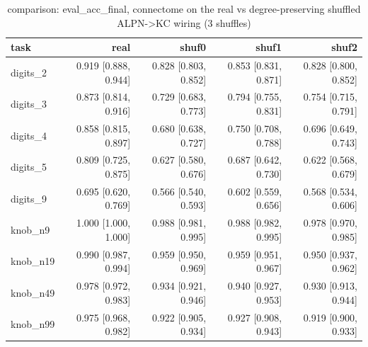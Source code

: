 \begin{table}[t]
\centering
\small
\begin{tabular}{lrrrr}
\toprule
task & real & shuf0 & shuf1 & shuf2 \\
\midrule
digits\_2 & 0.919 [0.888, 0.944] & 0.828 [0.803, 0.852] & 0.853 [0.831, 0.871] & 0.828 [0.800, 0.852] \\
digits\_3 & 0.873 [0.814, 0.916] & 0.729 [0.683, 0.773] & 0.794 [0.755, 0.831] & 0.754 [0.715, 0.791] \\
digits\_4 & 0.858 [0.815, 0.897] & 0.680 [0.638, 0.727] & 0.750 [0.708, 0.788] & 0.696 [0.649, 0.743] \\
digits\_5 & 0.809 [0.725, 0.875] & 0.627 [0.580, 0.676] & 0.687 [0.642, 0.730] & 0.622 [0.568, 0.679] \\
digits\_9 & 0.695 [0.620, 0.769] & 0.566 [0.540, 0.593] & 0.602 [0.559, 0.656] & 0.568 [0.534, 0.606] \\
knob\_n9 & 1.000 [1.000, 1.000] & 0.988 [0.981, 0.995] & 0.988 [0.982, 0.995] & 0.978 [0.970, 0.985] \\
knob\_n19 & 0.990 [0.987, 0.994] & 0.959 [0.950, 0.969] & 0.959 [0.951, 0.967] & 0.950 [0.937, 0.962] \\
knob\_n49 & 0.978 [0.972, 0.983] & 0.934 [0.921, 0.946] & 0.940 [0.927, 0.953] & 0.930 [0.913, 0.944] \\
knob\_n99 & 0.975 [0.968, 0.982] & 0.922 [0.905, 0.934] & 0.927 [0.908, 0.943] & 0.919 [0.900, 0.933] \\
\bottomrule
\end{tabular}
\caption{comparison: eval\_acc\_final, connectome on the real vs degree-preserving shuffled ALPN->KC wiring (3 shuffles)}
\label{tab:wiring_comparison}
\end{table}